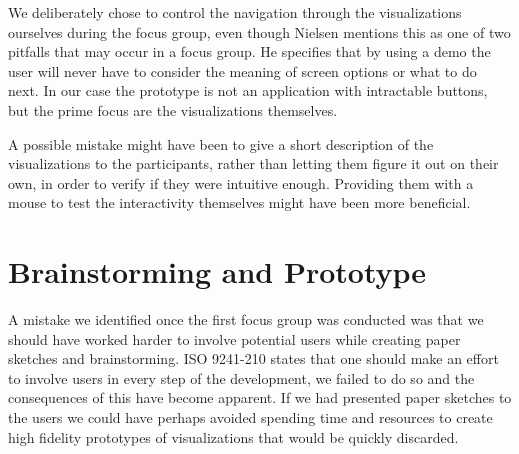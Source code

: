 We deliberately chose to control the navigation through the visualizations ourselves during the focus group, even though Nielsen mentions this as one of two pitfalls that may occur in a focus group. He specifies that by using a demo the user will never have to consider the meaning of screen options or what to do next. In our case the prototype is not an application with intractable buttons, but the prime focus are the visualizations themselves. 

A possible mistake might have been to give a short description of the visualizations to the participants, rather than letting them figure it out on their own, in order to verify if they were intuitive enough. Providing them with a mouse to test the interactivity themselves might have been more beneficial.

\section{Brainstorming and Prototype}
A mistake we identified once the first focus group was conducted was that we should have worked harder to involve potential users while creating paper sketches and brainstorming. ISO 9241-210 states that one should make an effort to involve users in every step of the development, we failed to do so and the consequences of this have become apparent. If we had presented paper sketches to the users we could have perhaps avoided spending time and resources to create high fidelity prototypes of visualizations that would be quickly discarded.
